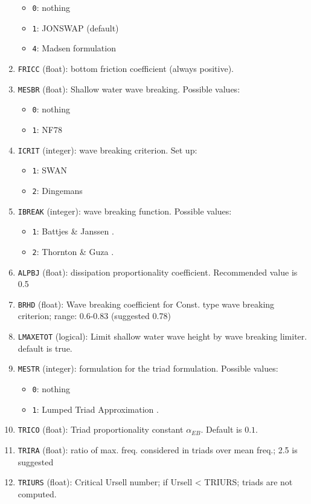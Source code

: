 \documentclass[12pt]{amsart}
\begin{document}
\begin{enumerate}
  \begin{itemize}
  \item {\tt 0}: nothing
  \item {\tt 1}: JONSWAP (default)
  \item {\tt 4}: Madsen formulation
  \end{itemize}
\item {\tt FRICC} (float): bottom friction coefficient (always positive).
\item {\tt MESBR} (float): Shallow water wave breaking. Possible values:
  \begin{itemize}
  \item {\tt 0}: nothing
  \item {\tt 1}: NF78
  \end{itemize}
\item {\tt ICRIT} (integer): wave breaking criterion. Set up:
  \begin{itemize}
  \item {\tt 1}: SWAN
  \item {\tt 2}: Dingemans
  \end{itemize}
\item {\tt IBREAK} (integer): wave breaking function. Possible values:
  \begin{itemize}
  \item {\tt 1}: Battjes \& Janssen \cite{BattjesJanssen}.
  \item {\tt 2}: Thornton \& Guza \cite{ThorntonGuza}.
  \end{itemize}
\item {\tt ALPBJ} (float): dissipation proportionality coefficient. Recommended value is 0.5
\item {\tt BRHD} (float): Wave breaking coefficient for Const. type wave breaking criterion; range: 0.6-0.83 (suggested 0.78)
\item {\tt LMAXETOT} (logical): Limit shallow water wave height by wave breaking limiter. default is true.
\item {\tt MESTR} (integer): formulation for the triad formulation. Possible values:
  \begin{itemize}
  \item {\tt 0}: nothing
  \item {\tt 1}: Lumped Triad Approximation \cite{LTA}.
  \end{itemize}
\item {\tt TRICO} (float): Triad proportionality constant $\alpha_{EB}$. Default is $0.1$.
\item {\tt TRIRA} (float): ratio of max. freq. considered in triads over mean freq.; 2.5 is suggested
\item {\tt TRIURS} (float): Critical Ursell number; if Ursell < TRIURS; triads are not computed.
\end{enumerate}
\end{document}

